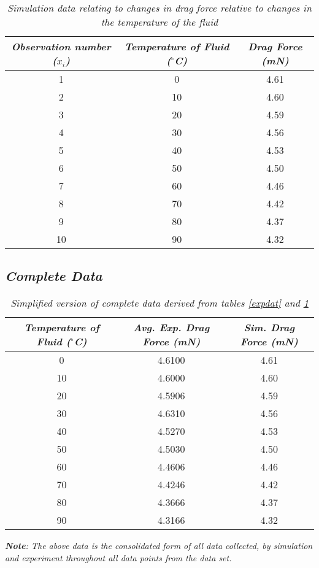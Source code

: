 	\begin{table}[H]
		\centering
		\begin{tabular}{|c|c|c|}
			\hline
			\hline
			\textit{Observation number ($x_i$)} & \textit{Temperature of Fluid ($^\circ$C)} & \textit{Drag Force (mN)} \\
			\hline
			\hline
			1 & 0 & 4.61 \\
			\hline
			2 & 10 & 4.60 \\
			\hline
			3 & 20 & 4.59 \\
			\hline
			4 & 30 & 4.56 \\
			\hline
			5 & 40 & 4.53 \\
			\hline
			6 & 50 & 4.50 \\
			\hline
			7 & 60 & 4.46 \\
			\hline
			8 & 70 & 4.42 \\
			\hline
			9 & 80 & 4.37 \\
			\hline
			10 & 90 & 4.32 \\
			\hline
			\hline
		\end{tabular}
		\caption{\textit{Simulation data relating to changes in drag force relative to changes in the temperature of the fluid}}
		\label{simdat}
	\end{table}

\subsection{\textit{Complete Data}}

	\begin{table}[H]
		\centering
		\begin{tabular}{|c|c|c|}
			\hline
			\hline
			\textit{Temperature of Fluid ($^\circ$C)} & \textit{Avg. Exp. Drag Force (mN)} & \textit{Sim. Drag Force (mN)}\\
			\hline
			\hline
			0 & 4.6100 & 4.61 \\
			\hline
			10 & 4.6000 & 4.60 \\
			\hline
			20 & 4.5906 & 4.59 \\
			\hline
			30 & 4.6310 & 4.56 \\
			\hline
			40 & 4.5270 & 4.53 \\
			\hline
			50 & 4.5030 & 4.50 \\
			\hline
			60 & 4.4606 & 4.46 \\
			\hline
			70 & 4.4246 & 4.42 \\
			\hline
			80 & 4.3666 & 4.37 \\
			\hline
			90 & 4.3166 & 4.32 \\
			\hline
			\hline
		\end{tabular}
		\caption{\textit{Simplified version of complete data derived from tables \ref{expdat} and \ref{simdat}}}
		
	\end{table}

	\textit{\textbf{Note}: The above data is the consolidated form of all data collected, by simulation and experiment throughout all data points from the data set.}

